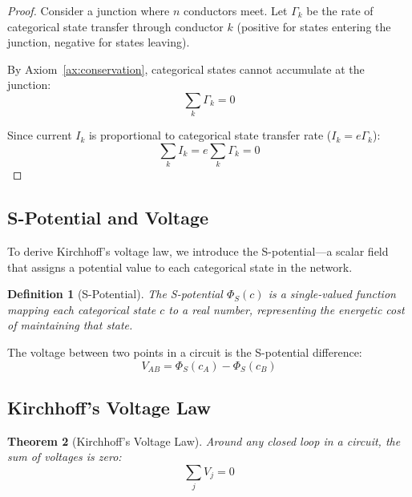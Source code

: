 \documentclass[twocolumn,showpacs,preprintnumbers,amsmath,amssymb,prd]{revtex4-2}
\newtheorem{theorem}{Theorem}[section]
\newtheorem{definition}[theorem]{Definition}
\begin{document}
\begin{proof}
Consider a junction where $n$ conductors meet. Let $\Gamma_k$ be the rate of categorical state transfer through conductor $k$ (positive for states entering the junction, negative for states leaving).

By Axiom~\ref{ax:conservation}, categorical states cannot accumulate at the junction:
\begin{equation}
\sum_k \Gamma_k = 0
\label{eq:categorical_conservation}
\end{equation}

Since current $I_k$ is proportional to categorical state transfer rate ($I_k = e\Gamma_k$):
\begin{equation}
\sum_k I_k = e \sum_k \Gamma_k = 0
\end{equation}
\end{proof}

\subsection{S-Potential and Voltage}

To derive Kirchhoff's voltage law, we introduce the S-potential---a scalar field that assigns a potential value to each categorical state in the network.

\begin{definition}[S-Potential]
\label{def:s_potential}
The S-potential $\Phi_S(c)$ is a single-valued function mapping each categorical state $c$ to a real number, representing the energetic cost of maintaining that state.
\end{definition}

The voltage between two points in a circuit is the S-potential difference:
\begin{equation}
V_{AB} = \Phi_S(c_A) - \Phi_S(c_B)
\label{eq:voltage_s}
\end{equation}

\subsection{Kirchhoff's Voltage Law}

\begin{theorem}[Kirchhoff's Voltage Law]
\label{thm:kvl}
Around any closed loop in a circuit, the sum of voltages is zero:
\begin{equation}
\sum_j V_j = 0
\label{eq:kvl}
\end{equation}
\end{theorem}
\end{document}
